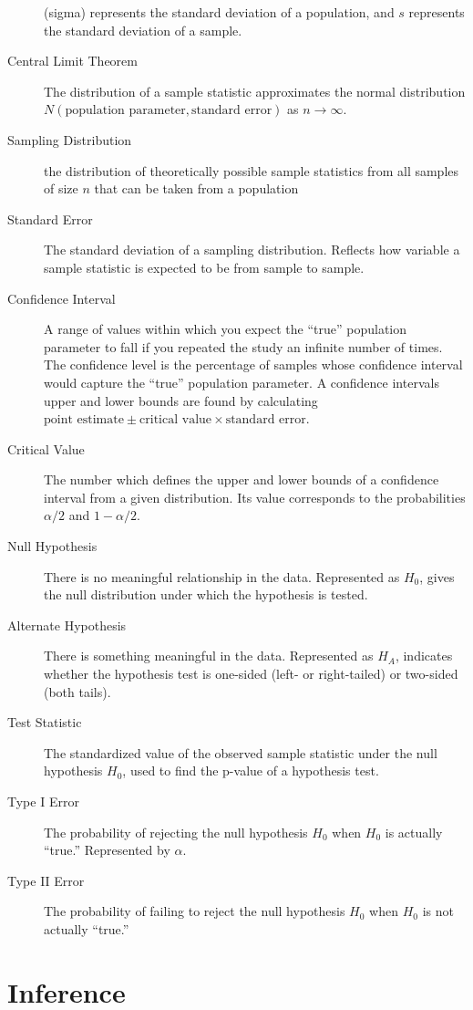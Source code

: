\documentclass[
  letterpaper,
  DIV=11,
  numbers=noendperiod]{scrartcl}
\begin{document}
\begin{description}
(sigma) represents the standard deviation of a population, and \(s\)
represents the standard deviation of a sample.
\item[Central Limit Theorem]
The distribution of a sample statistic approximates the normal
distribution
\(N\left(\text{population parameter}, \text{standard error}\right)\) as
\(n \to \infty\).
\item[Sampling Distribution]
the distribution of theoretically possible sample statistics from all
samples of size \(n\) that can be taken from a population
\item[Standard Error]
The standard deviation of a sampling distribution. Reflects how variable
a sample statistic is expected to be from sample to sample.
\item[Confidence Interval]
A range of values within which you expect the ``true'' population
parameter to fall if you repeated the study an infinite number of times.
The confidence level is the percentage of samples whose confidence
interval would capture the ``true'' population parameter. A confidence
intervals upper and lower bounds are found by calculating
\(\text{point estimate} \pm \text{critical value} \times \text{standard error}\).
\item[Critical Value]
The number which defines the upper and lower bounds of a confidence
interval from a given distribution. Its value corresponds to the
probabilities \(\alpha/2\) and \(1-\alpha/2\).
\item[Null Hypothesis]
There is no meaningful relationship in the data. Represented as \(H_0\),
gives the null distribution under which the hypothesis is tested.
\item[Alternate Hypothesis]
There is something meaningful in the data. Represented as \(H_A\),
indicates whether the hypothesis test is one-sided (left- or
right-tailed) or two-sided (both tails).
\item[Test Statistic]
The standardized value of the observed sample statistic under the null
hypothesis \(H_0\), used to find the p-value of a hypothesis test.
\item[Type I Error]
The probability of rejecting the null hypothesis \(H_0\) when \(H_0\) is
actually ``true.'' Represented by \(\alpha\).
\item[Type II Error]
The probability of failing to reject the null hypothesis \(H_0\) when
\(H_0\) is not actually ``true.''
\end{description}

\section{Inference}\label{inference}
\end{document}
